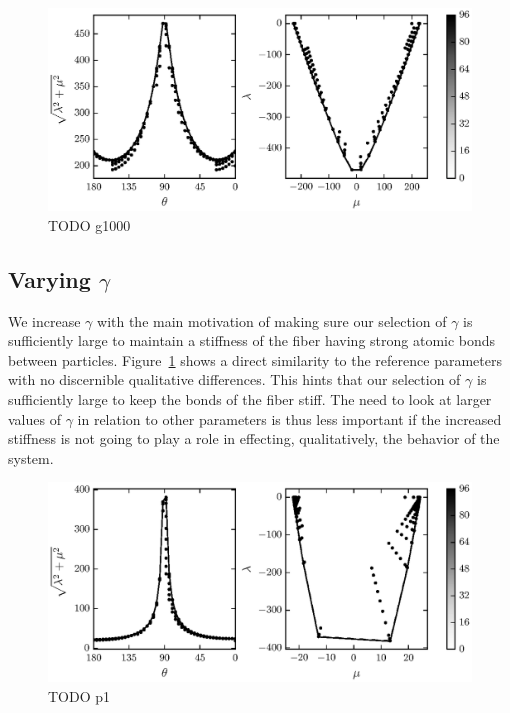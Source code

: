 	\begin{figure}
		\begin{center}
			\includegraphics{./fig/ch3/pull/g1000/grid.eps}
		\end{center}		
		\caption{ TODO g1000
		\label{fig:PullGrid:g1000}}
	\end{figure}

\subsection{Varying $\gamma$}

We increase $\gamma$ with the main motivation of making sure our selection of $\gamma$ is sufficiently large to maintain a stiffness of the fiber having strong atomic bonds between particles. Figure~\ref{fig:PullGrid:g1000} shows a direct similarity to the reference parameters with no discernible qualitative differences. This hints that our selection of $\gamma$ is sufficiently large to keep the bonds of the fiber stiff. The need to look at larger values of $\gamma$ in relation to other parameters is thus less important if the increased stiffness is not going to play a role in effecting, qualitatively, the behavior of the system.

	\begin{figure}
		\begin{center}
			\includegraphics{./fig/ch3/pull/p1/grid.eps}
		\end{center}		
		\caption{ TODO p1
		\label{fig:PullGrid:p1}}
	\end{figure}
	
